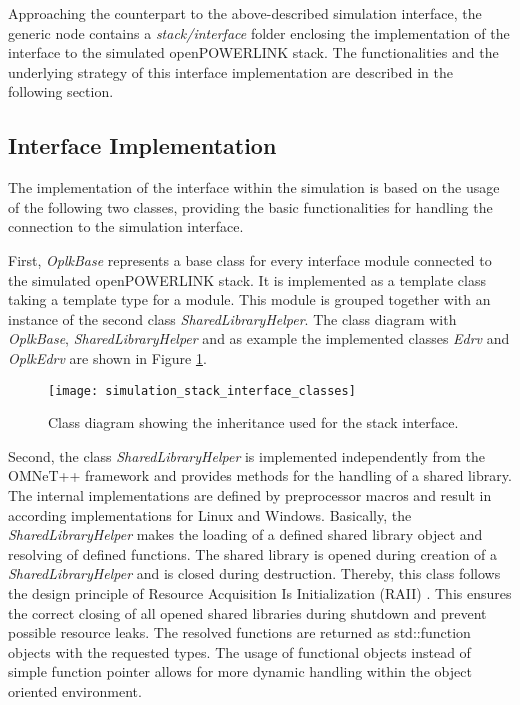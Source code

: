 Approaching the counterpart to the above-described simulation interface, the generic node contains a \emph{stack/interface} folder enclosing the implementation of the interface to the simulated openPOWERLINK stack.
The functionalities and the underlying strategy of this interface implementation are described in the following section.

\subsection{Interface Implementation}
\label{sec:porting_stack_interface}
The implementation of the interface within the simulation is based on the usage of the following two classes, providing the basic functionalities for handling the connection to the simulation interface.

First, \emph{OplkBase} represents a base class for every interface module connected to the simulated openPOWERLINK stack.
It is implemented as a template class taking a template type for a module.
This module is grouped together with an instance of the second class \emph{SharedLibraryHelper}.
The class diagram with \emph{OplkBase}, \emph{SharedLibraryHelper} and as example the implemented classes \emph{Edrv} and \emph{OplkEdrv} are shown in Figure \ref{fig:simulation_stack_interface_classes}.

\begin{figure}
    \centering
    \texttt{[image: simulation\_stack\_interface\_classes]}
    \caption{Class diagram showing the inheritance used for the stack interface.}
    \label{fig:simulation_stack_interface_classes}
\end{figure}

\begin{sloppypar}
Second, the class \emph{SharedLibraryHelper} is implemented independently from the OMNeT++ framework and provides methods for the handling of a shared library.
The internal implementations are defined by preprocessor macros and result in according implementations for Linux and Windows.
Basically, the \emph{SharedLibraryHelper} makes the loading of a defined shared library object and resolving of defined functions.
The shared library is opened during creation of a \emph{SharedLibraryHelper} and is closed during destruction.
Thereby, this class follows the design principle of Resource Acquisition Is Initialization (RAII) \cite{cpp_raii}.
This ensures the correct closing of all opened shared libraries during shutdown and prevent possible resource leaks.
The resolved functions are returned as std::function objects with the requested types.
The usage of functional objects instead of simple function pointer allows for more dynamic handling within the object oriented environment.
\end{sloppypar}

